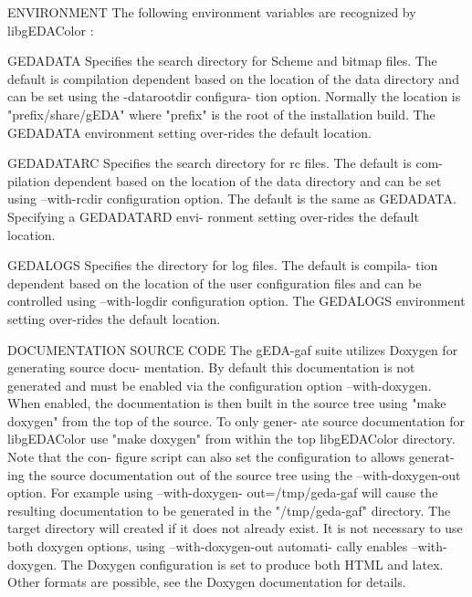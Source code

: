 ENVIRONMENT
       The following environment variables are recognized by libgEDAColor :

          GEDADATA
              Specifies  the search directory for Scheme and bitmap files. The
              default is compilation dependent based on the  location  of  the
              data  directory and can be set using the -datarootdir configura-
              tion option. Normally the location is "prefix/share/gEDA"  where
              "prefix"  is  the  root of the installation build.  The GEDADATA
              environment setting over-rides the default location.

          GEDADATARC
              Specifies the search directory for rc files. The default is com-
              pilation  dependent  based on the location of the data directory
              and can be set  using  --with-rcdir  configuration  option.  The
              default  is the same as GEDADATA.  Specifying a GEDADATARD envi-
              ronment setting over-rides the default location.

          GEDALOGS
              Specifies the directory for log files. The default  is  compila-
              tion  dependent  based on the location of the user configuration
              files and can be controlled  using  --with-logdir  configuration
              option.  The GEDALOGS environment setting over-rides the default
              location.

DOCUMENTATION
          SOURCE CODE
              The gEDA-gaf suite utilizes Doxygen for generating source  docu-
              mentation.  By  default  this documentation is not generated and
              must be enabled via  the  configuration  option  --with-doxygen.
              When enabled, the documentation is then built in the source tree
              using "make doxygen" from the top of the source. To only  gener-
              ate  source  documentation  for  libgEDAColor use "make doxygen"
              from within the top libgEDAColor directory. Note that  the  con-
              figure  script can also set the configuration to allows generat-
              ing the source documentation out of the source  tree  using  the
              --with-doxygen-out  option.  For  example  using --with-doxygen-
              out=/tmp/geda-gaf will cause the resulting documentation  to  be
              generated in the "/tmp/geda-gaf" directory. The target directory
              will created if it does not already exist. It is  not  necessary
              to  use both doxygen options, using --with-doxygen-out automati-
              cally enables --with-doxygen.  The Doxygen configuration is  set
              to  produce both HTML and latex. Other formats are possible, see
              the Doxygen documentation for details.

